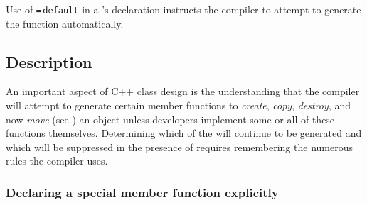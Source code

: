 
\label{Defaulted-Special-Member-Functions}
\setcounter{table}{0}
\setcounter{footnote}{0}
\setcounter{lstlisting}{0}


Use of \lstinline!=!\,\lstinline!default! in a 's
declaration instructs the compiler to attempt to generate the function
automatically.

\subsection[Description]{Description}\label{description}

An important aspect of C++ class design is the understanding that the
compiler will attempt to generate certain member functions to
\emph{create}, \emph{copy}, \emph{destroy}, and now
\emph{move} (see )
an object unless
developers implement some or all of these functions
themselves. Determining which of the 
will continue to be generated and which will be suppressed in the
presence of 
requires remembering the numerous rules the compiler uses.

\subsubsection[Declaring a special member function explicitly]{Declaring a special member function explicitly}\label{declaring-a-special-member-function-explicitly}

